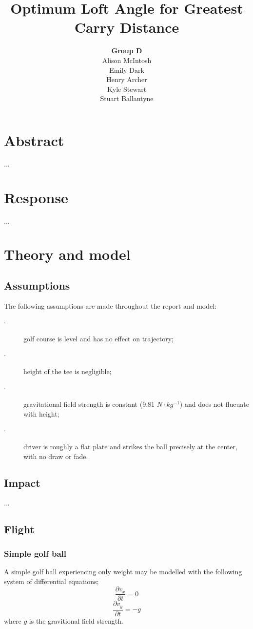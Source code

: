 \documentclass[12pt]{article}
\title{\textbf{Optimum Loft Angle for Greatest Carry Distance}}
\author{\textbf{Group D}\\
		Alison McIntosh\\
		Emily Dark\\
		Henry Archer\\
		Kyle Stewart\\
		Stuart Ballantyne}
\date{}
\begin{document}
\begin{titlepage}
\maketitle
\thispagestyle{empty}
\pagebreak
\end{titlepage}


\section{Abstract}
...


\section{Response}
...

\section{Theory and model}

\subsection{Assumptions}
The following assumptions are made throughout the report and model:
\begin{description}
  \item[$\cdot$] golf course is level and has no effect on trajectory;
  \item[$\cdot$] height of the tee is negligible;
  \item[$\cdot$] gravitational field strength is constant (9.81 $N\cdot kg^{-1}$) and does not flucuate with height;
  \item[$\cdot$] driver is roughly a flat plate and strikes the ball precisely at the center, with no draw or fade.
\end{description}

\subsection{Impact}
...
\pagebreak
\subsection{Flight}
\subsubsection{Simple golf ball}
A simple golf ball experiencing only weight may be modelled with the following system of differential equations;
\begin{equation}
\frac{\partial v_x}{\partial t}=0
\end{equation}
\begin{equation}
\frac{\partial v_y}{\partial t}=-g
\end{equation}
where $g$ is the gravitional field strength.
\end{document}
